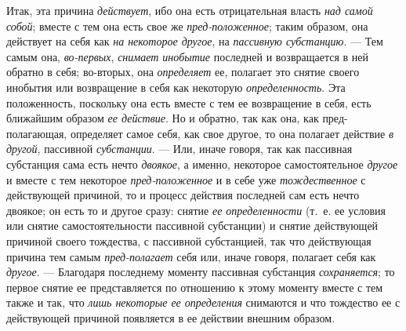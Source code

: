 Итак, эта причина {\em действует}, ибо она есть
отрицательная власть {\em над самой собой}; вместе с
тем она есть свое же {\em пред-положенное}; таким
образом, она действует на себя как {\em на некоторое
другое}, на {\em пассивную субстанцию}. — Тем самым
она, {\em во-первых}, {\em снимает
инобытие} последней и возвращается в ней обратно в себя; во-вторых, она
{\em определяет} ее, полагает это снятие своего
инобытия или возвращение в себя как некоторую
{\em определенность}. Эта положенность, поскольку она
есть вместе с тем ее возвращение в себя, есть ближайшим образом
{\em ее действие}. Но и обратно, так как она, как
пред-полагающая, определяет самое себя, как свое другое, то она полагает
действие {\em в другой}, пассивной
{\em субстанции}. — Или, иначе говоря, так как
пассивная субстанция сама есть нечто {\em двоякое}, а
именно, некоторое самостоятельное {\em другое} и вместе
с тем некоторое {\em пред-положенное} и в себе уже
{\em тождественное} с действующей причиной, то и
процесс действия последней сам есть нечто двоякое; он есть то и другое
сразу: снятие {\em ее определенности} (т.~е. ее условия
или снятие самостоятельности пассивной субстанции) и снятие действующей
причиной своего тождества, с пассивной субстанцией, так что действующая
причина тем самым {\em пред-полагает} себя или, иначе
говоря, полагает себя как {\em другое}. — Благодаря
последнему моменту пассивная субстанция
{\em сохраняется}; то первое снятие ее представляется
по отношению к этому моменту вместе с тем также и так, что
{\em лишь некоторые ее определения} снимаются и что
тождество ее с действующей причиной появляется в ее действии внешним
образом.

